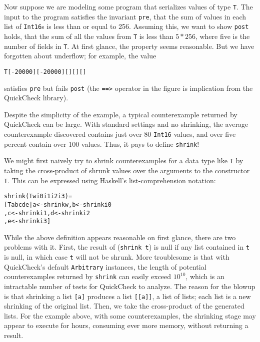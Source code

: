 \documentclass{sigplanconf}
\newenvironment{code}{\begin{alltt}\footnotesize}{\end{alltt}}
\newcommand{\ttp}[1]{\texttt{#1}}
\begin{document}
Now suppose we are modeling some program that serializes values of type \ttp{T}.
The input to the program satisfies the invariant \ttp{pre}, that the sum of
values in each list of \ttp{Int16}s is less than or equal to 256.  Assuming this,
we want to show \ttp{post} holds, that the sum of all the values from \ttp{T} is
less than $5 * 256$, where five is the number of fields in \ttp{T}.  At first
glance, the property seems reasonable.  But we have forgotten about underflow;
for example, the value
%
\begin{code}
T [-20000] [-20000] [] [] []
\end{code}
%
\noindent
satisfies \ttp{pre} but fails \ttp{post} (the \ttp{==>} operator in the figure
is implication from the QuickCheck library).

Despite the simplicity of the example, a typical counterexample returned by
QuickCheck can be large.  With standard settings and no shrinking, the average
counterexample discovered contains just over 80 \ttp{Int16} values, and over
five percent contain over 100 values.  Thus, it pays to define
\ttp{shrink}!

We might first naively try to shrink counterexamples for a data type like
\ttp{T} by taking the cross-product of shrunk values over the arguments to the
constructor \ttp{T}.  This can be expressed using Haskell's list-comprehension
notation:
%
\begin{code}
shrink (T w i0 i1 i2 i3) =
  [ T a b c d e | a <- shrink w,  b <- shrink i0
                , c <- shrink i1, d <- shrink i2
                , e <- shrink i3 ]
\end{code}
%
\noindent
While the above definition appears reasonable on first glance, there are two
problems with it.  First, the result of (\ttp{shrink t}) is null if any list
contained in \ttp{t} is null, in which case \ttp{t} will not be shrunk.  More
troublesome is that with QuickCheck's default \ttp{Arbitrary} instances, the
length of potential counterexamples returned by \ttp{shrink} can easily exceed
$10^{10}$, which is an intractable number of tests for QuickCheck to analyze.
The reason for the blowup is that shrinking a list \ttp{[a]} produces a list
\ttp{[[a]]}, a list of lists; each list is a new shrinking of the original list.
Then, we take the cross-product of the generated lists.  For the example above,
with some counterexamples, the shrinking stage may appear to execute for hours,
consuming ever more memory, without returning a result.
\end{document}
